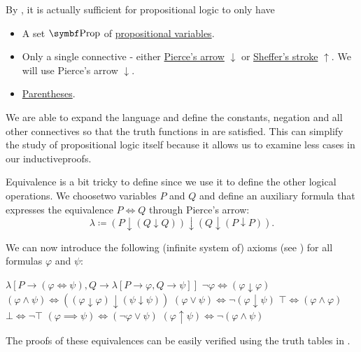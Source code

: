 \begin{remark}\label{remark:minimal_propositional_language}
  By , it is actually sufficient for propositional logic to only have
  \begin{itemize}
    \item A set \( \Bold{Prop} \) of \hyperref[def:propositional_language/prop]{propositional variables}.
    \item Only a single connective - either \hyperref[def:propositional_language/connectives/pierces_arrow]{Pierce's arrow} \( \downarrow \) or \hyperref[def:propositional_language/sheffer_stroke]{Sheffer's stroke} \( \uparrow \). We will use Pierce's arrow \( \downarrow \).
    \item \hyperref[def:propositional_language/parentheses]{Parentheses}.
  \end{itemize}

  We are able to expand the language and define the constants, negation and all other connectives so that the truth functions in  are satisfied. This can simplify the study of propositional logic itself because it allows us to examine less cases in our inductive\IND proofs.

  Equivalence is a bit tricky to define since we use it to define the other logical operations. We choose\AOC two variables \( P \) and \( Q \) and define an auxiliary formula that expresses the equivalence \( P \iff Q \) through Pierce's arrow:
  \begin{equation*}
    \lambda \coloneqq (P \downarrow (Q \downarrow Q)) \downarrow (Q \downarrow (P \downarrow P)).
  \end{equation*}

  We can now introduce the following (infinite system of) axioms (see ) for all formulas \( \varphi \) and \( \psi \):
  \begin{RefList}
     \( \lambda[P \to (\varphi \iff \psi), Q \to \lambda[P \to \varphi, Q \to \psi]] \)
     \( \neg \varphi \iff (\varphi \downarrow \varphi) \)
     \( (\varphi \wedge \psi) \iff ((\varphi \downarrow \varphi) \downarrow (\psi \downarrow \psi)) \)
     \( (\varphi \vee \psi) \iff \neg (\varphi \downarrow \psi) \)
     \( \top \iff (\varphi \wedge \varphi) \)
     \( \bot \iff \neg \top \)
     \( (\varphi \implies \psi) \iff (\neg \varphi \vee \psi) \)
     \( (\varphi \uparrow \psi) \iff \neg (\varphi \wedge \psi) \)
  \end{RefList}

  The proofs of these equivalences can be easily verified using the truth tables in .
\end{remark}

